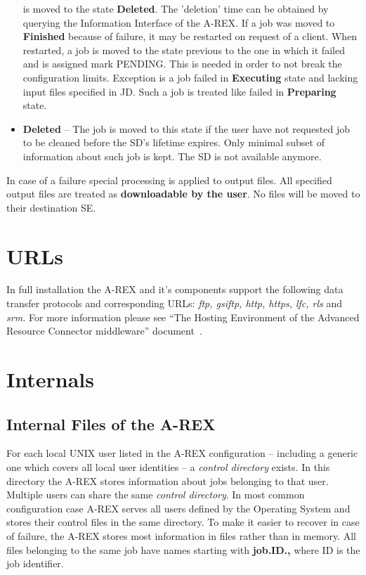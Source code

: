 \documentclass{article}                            %
\begin{document}
\begin{itemize}
is moved to the state \textbf{Deleted}. The 'deletion' time can be
obtained by querying the Information Interface of the A-REX. If a
job was moved to \textbf{Finished} because of failure, it may be restarted
on request of a client. When restarted, a job is moved to the state
previous to the one in which it failed and is assigned mark PENDING.
This is needed in order to not break the configuration limits. Exception
is a job failed in \textbf{Executing} state and lacking input files
specified in JD. Such a job is treated like failed in \textbf{Preparing}
state.
\item \textbf{Deleted} -- The job is moved to this state if the user have
not requested job to be cleaned before the SD's lifetime expires.
Only minimal subset of information about such job is kept. The SD
is not available anymore.
\end{itemize}
In case of a failure special processing is applied to output files.
All specified output files are treated as \textbf{downloadable by
the user}. No files will be moved to their destination SE.

\section{URLs\label{sec:urls}}

In full installation the A-REX and it's components support the following
data transfer protocols and corresponding URLs: \emph{ftp, gsiftp,
http, https, lfc, rls} and \emph{srm.} For more information please see
{}``The Hosting Environment of the Advanced Resource Connector middleware''
document~\cite{hed}.

\section{Internals\label{section:internals}}

\subsection{Internal Files of the A-REX}

For each local UNIX user listed in the A-REX configuration -- including
a generic one which covers all local user identities -- a \textit{control
directory} exists. In this directory the A-REX stores information
about jobs belonging to that user. Multiple users can share the same
\textit{control directory}. In most common configuration case A-REX
serves all users defined by the Operating System and stores their control
files in the same directory. To make it easier to recover in case of failure,
the A-REX stores most information in files rather than in memory.
All files belonging to the same job have names starting with \textbf{job.ID.,}
where ID is the job identifier.
\end{document}

